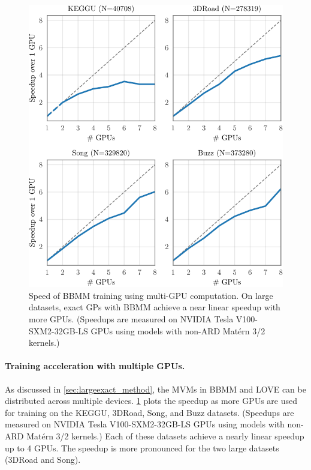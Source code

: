 \begin{figure}[t!]
  \centering
  \includegraphics[width=0.70\linewidth]{figures/gpu_speedup.pdf}
  \caption[Speed of BBMM training using multi-GPU computation.]{
    Speed of BBMM training using multi-GPU computation.
    On large datasets, exact GPs with BBMM achieve a near linear speedup with more GPUs.
    (Speedups are measured on NVIDIA Tesla V100-SXM2-32GB-LS GPUs using models with non-ARD Mat\'ern 3/2 kernels.)
  }
  \label{fig:gpu_speedup}
\end{figure}

\paragraph{Training acceleration with multiple GPUs.}
As discussed in \cref{sec:largeexact_method}, the MVMs in BBMM and LOVE can be distributed across multiple devices.
\cref{fig:gpu_speedup} plots the speedup as more GPUs are used for training on the KEGGU, 3DRoad, Song, and Buzz datasets.
(Speedups are measured on NVIDIA Tesla V100-SXM2-32GB-LS GPUs using models with non-ARD Mat\'ern 3/2 kernels.)
Each of these datasets achieve a nearly linear speedup up to 4 GPUs.
The speedup is more pronounced for the two large datasets (3DRoad and Song).

